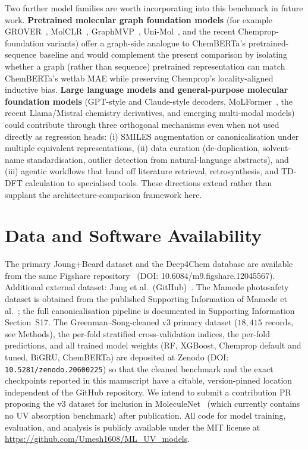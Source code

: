 \documentclass[journal=jcisd8,manuscript=article]{achemso}
\begin{document}
Two further model families are worth incorporating into this benchmark in future work. \textbf{Pretrained molecular graph foundation models} (for example GROVER~\cite{rong2020grover}, MolCLR~\cite{wang2022molecular}, GraphMVP~\cite{liu2021pretraining}, Uni-Mol~\cite{zhou2023unimol}, and the recent Chemprop-foundation variants) offer a graph-side analogue to ChemBERTa's pretrained-sequence baseline and would complement the present comparison by isolating whether a graph (rather than sequence) pretrained representation can match ChemBERTa's wetlab MAE while preserving Chemprop's locality-aligned inductive bias. \textbf{Large language models and general-purpose molecular foundation models} (GPT-style and Claude-style decoders, MoLFormer~\cite{ross2022molformer}, the recent Llama/Mistral chemistry derivatives, and emerging multi-modal models) could contribute through three orthogonal mechanisms even when not used directly as regression heads: (i) SMILES augmentation or canonicalisation under multiple equivalent representations, (ii) data curation (de-duplication, solvent-name standardisation, outlier detection from natural-language abstracts), and (iii) agentic workflows that hand off literature retrieval, retrosynthesis, and TD-DFT calculation to specialised tools. These directions extend rather than supplant the architecture-comparison framework here.


\section*{Data and Software Availability}
The primary Joung+Beard dataset and the Deep4Chem database are available from the same Figshare repository~\cite{joung2020experimental, beard2019comparative} (DOI: 10.6084/m9.figshare.12045567).
Additional external dataset: Jung et al.\ (GitHub)~\cite{jung2024machine}.
The Mamede photosafety dataset is obtained from the published Supporting Information of Mamede et al.~\cite{mamede2021machine}; the full canonicalisation pipeline is documented in Supporting Information Section~S17.
The Greenman--Song-cleaned v3 primary dataset ($18{,}415$ records, see Methods), the per-fold stratified cross-validation indices, the per-fold predictions, and all trained model weights (RF, XGBoost, Chemprop default and tuned, BiGRU, ChemBERTa) are deposited at Zenodo (DOI: \texttt{10.5281/zenodo.20600225}) so that the cleaned benchmark and the exact checkpoints reported in this manuscript have a citable, version-pinned location independent of the GitHub repository. We intend to submit a contribution PR proposing the v3 dataset for inclusion in MoleculeNet~\cite{wuMoleculeNet2018} (which currently contains no UV absorption benchmark) after publication. All code for model training, evaluation, and analysis is publicly available under the MIT license at \url{https://github.com/Umesh1608/ML_UV_models}.
\end{document}
